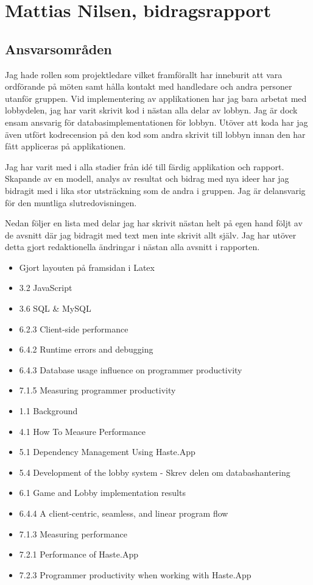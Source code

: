 \section{Mattias Nilsen, bidragsrapport}
\subsection{Ansvarsområden}
Jag hade rollen som projektledare vilket framförallt har inneburit att vara ordförande på möten samt hålla kontakt med handledare och andra personer utanför gruppen.
Vid implementering av applikationen har jag bara arbetat med lobbydelen, jag har varit skrivit kod i nästan alla delar av lobbyn. Jag är dock ensam ansvarig för databasimplementationen för lobbyn.
Utöver att koda har jag även utfört kodrecension på den kod som andra skrivit till lobbyn innan den har fått appliceras på applikationen.

Jag har varit med i alla stadier från idé till färdig applikation och rapport.
Skapande av en modell, analys av resultat och bidrag med nya ideer har jag bidragit med i lika stor utsträckning som de andra i gruppen.
Jag är delansvarig för den muntliga slutredovisningen.

Nedan följer en lista med delar jag har skrivit nästan helt på egen hand följt av de avsnitt där jag bidragit med text men inte skrivit allt själv.
Jag har utöver detta gjort redaktionella ändringar i nästan alla avsnitt i rapporten.

\begin{itemize}
    \item Gjort layouten på framsidan i Latex
    \item 3.2 JavaScript
    \item 3.6 SQL & MySQL
    \item 6.2.3 Client-side performance
    \item 6.4.2 Runtime errors and debugging
    \item 6.4.3 Database usage influence on programmer productivity
    \item 7.1.5 Measuring programmer productivity
\end{itemize}

\begin{itemize}
    \item 1.1 Background
    \item 4.1 How To Measure Performance
    \item 5.1 Dependency Management Using Haste.App
    \item 5.4 Development of the lobby system - Skrev delen om databashantering
    \item 6.1 Game and Lobby implementation results
    \item 6.4.4 A client-centric, seamless, and linear program flow
    \item 7.1.3 Measuring performance
    \item 7.2.1 Performance of Haste.App
    \item 7.2.3 Programmer productivity when working with Haste.App
\end{itemize}


